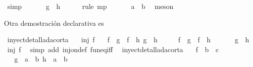 \begin{isabellebody}
\ simp\isanewline
\ \ \isamarkupfalse%
\isanewline
\ \ \isamarkupfalse%
\ {\isachardoublequoteopen}{\isacharquery}g\ {\isacharequal}\ {\isacharquery}h{\isachardoublequoteclose}\ \isamarkupfalse%
\ {}\ {}\ \isamarkupfalse%
\ {\isacharparenleft}rule\ mp{\isacharparenright}\isanewline
\ \ \isamarkupfalse%
\ \isamarkupfalse%
\ {\isachardoublequoteopen}\ a\ {\isacharequal}\ b{\isachardoublequoteclose}\ \isamarkupfalse%
\ meson\isanewline
{}\isamarkupfalse%
%
\endisatagproof
{\isafoldproof}%
%
\isadelimproof
%
\endisadelimproof
%
\begin{isamarkuptext}%
Otra demostración declarativa es%
\end{isamarkuptext}\isamarkuptrue%
\isamarkupfalse%
\ inyectdetalladacorta{}{\isacharcolon}\isanewline
\ \ \ {\isachardoublequoteopen}inj\ f{\isachardoublequoteclose}\isanewline
\ \ \ {\isachardoublequoteopen}{\isacharparenleft}f\ {\isasymcirc}\ g\ {\isacharequal}\ f\ {\isasymcirc}\ h{\isacharparenright}\ {\isasymlongrightarrow}{\isacharparenleft}g\ {\isacharequal}\ h{\isacharparenright}{\isachardoublequoteclose}\isanewline
%
\isadelimproof
%
\endisadelimproof
%
\isatagproof
{}\isamarkupfalse%
\ \isanewline
\ \ \isamarkupfalse%
\ {\isachardoublequoteopen}f\ {\isasymcirc}\ g\ {\isacharequal}\ f\ {\isasymcirc}\ h{\isachardoublequoteclose}\ \isanewline
\ \ \isamarkupfalse%
\ \isamarkupfalse%
\ {\isachardoublequoteopen}g\ {\isacharequal}\ h{\isachardoublequoteclose}\ \isamarkupfalse%
\ {\isacharbackquoteopen}inj\ f{\isacharbackquoteclose}\ \isamarkupfalse%
\ {\isacharparenleft}simp\ add{\isacharcolon}\ inj{\isacharunderscore}on{\isacharunderscore}def\ fun{\isacharunderscore}eq{\isacharunderscore}iff{\isacharparenright}\ \isanewline
{}\isamarkupfalse%
%
\endisatagproof
{\isafoldproof}%
%
\isadelimproof
\isanewline
%
\endisadelimproof
\isanewline
{}\isamarkupfalse%
\ inyectdetalladacorta{}{\isacharcolon}\isanewline
\ \ \ f\ {\isacharcolon}{\isacharcolon}\ {\isachardoublequoteopen}{\isacharprime}b\ {\isasymRightarrow}\ {\isacharprime}c{\isachardoublequoteclose}\ \isanewline
\ \ \ {\isachardoublequoteopen}{\isasymforall}{\isacharparenleft}g\ {\isacharcolon}{\isacharcolon}\ {\isacharprime}a\ {\isasymRightarrow}\ {\isacharprime}b{\isacharparenright}\ {\isacharparenleft}h\ {\isacharcolon}{\isacharcolon}\ {\isacharprime}a\ {\isasymRightarrow}\ {\isacharprime}b{\isacharparenright}{\isachardot}\isanewline

\end{isabellebody}
